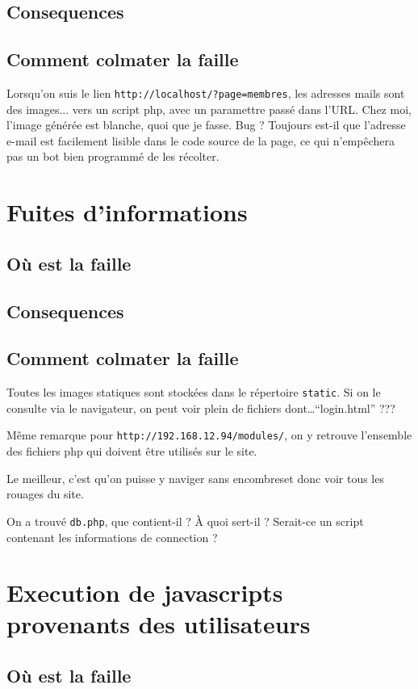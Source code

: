 \documentclass[oneside,10pt]{article}
\begin{document}
\subsection{Consequences}
\subsection{Comment colmater la faille}
Lorsqu'on suis le lien \verb+http://localhost/?page=membres+, les adresses mails sont des images... vers un script php, avec un paramettre pass\'e dans l'URL.
Chez moi, l'image g\'en\'er\'ee est blanche, quoi que je fasse. Bug ?
Toujours est-il que l'adresse e-mail est facilement lisible dans le code source de la page, ce qui n'emp\^echera pas un bot bien programm\'e de les r\'ecolter.

\section{Fuites d'informations}
\subsection{O\`u est la faille}
\subsection{Consequences}
\subsection{Comment colmater la faille}
Toutes les images statiques sont stock\'ees dans le r\'epertoire \verb+static+.
Si on le consulte via le navigateur, on peut voir plein de fichiers dont\ldots ``login.html'' ???

M\^eme remarque pour \verb+http://192.168.12.94/modules/+, on y retrouve l'ensemble des fichiers php qui doivent \^etre utilis\'es sur le site.

Le meilleur, c'est qu'on puisse y naviger sans encombreset donc voir tous les rouages du site.

On a trouv\'e \verb+db.php+, que contient-il ?
\`A quoi sert-il ?
Serait-ce un script contenant les informations de connection ?

\section{Execution de javascripts provenants des utilisateurs}
\subsection{O\`u est la faille}
\end{document}
